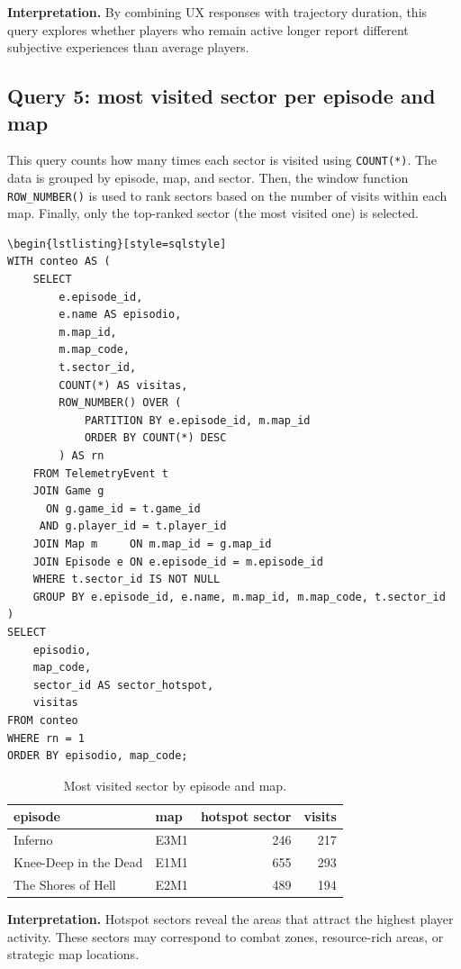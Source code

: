 \documentclass[11pt]{article}
\begin{document}
\textbf{Interpretation.} By combining UX responses with trajectory duration, this query explores whether players who remain active longer report different subjective experiences than average players.

\clearpage
\subsection{Query 5: most visited sector per episode and map}
This query counts how many times each sector is visited using \texttt{COUNT(*)}. The data is grouped by episode, map, and sector. Then, the window function \texttt{ROW\_NUMBER()} is used to rank sectors based on the number of visits within each map. Finally, only the top-ranked sector (the most visited one) is selected.

\begin{lstlisting}[style=sqlstyle]
\begin{lstlisting}[style=sqlstyle]
WITH conteo AS (
    SELECT
        e.episode_id,
        e.name AS episodio,
        m.map_id,
        m.map_code,
        t.sector_id,
        COUNT(*) AS visitas,
        ROW_NUMBER() OVER (
            PARTITION BY e.episode_id, m.map_id
            ORDER BY COUNT(*) DESC
        ) AS rn
    FROM TelemetryEvent t
    JOIN Game g
      ON g.game_id = t.game_id
     AND g.player_id = t.player_id
    JOIN Map m     ON m.map_id = g.map_id
    JOIN Episode e ON e.episode_id = m.episode_id
    WHERE t.sector_id IS NOT NULL
    GROUP BY e.episode_id, e.name, m.map_id, m.map_code, t.sector_id
)
SELECT
    episodio,
    map_code,
    sector_id AS sector_hotspot,
    visitas
FROM conteo
WHERE rn = 1
ORDER BY episodio, map_code;
\end{lstlisting}

\begin{table}[H]
\centering
\begin{tabular}{llrr}
\toprule
\textbf{episode} & \textbf{map} & \textbf{hotspot sector} & \textbf{visits} \\
\midrule
Inferno & E3M1 & 246 & 217 \\
Knee-Deep in the Dead & E1M1 & 655 & 293 \\
The Shores of Hell & E2M1 & 489 & 194 \\
\bottomrule
\end{tabular}
\caption{Most visited sector by episode and map.}
\end{table}

\textbf{Interpretation.} Hotspot sectors reveal the areas that attract the highest player activity. These sectors may correspond to combat zones, resource-rich areas, or strategic map locations.
\end{document}
